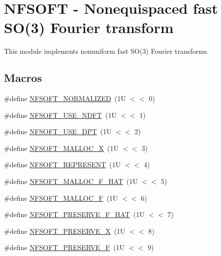 \hypertarget{group__nfsoft}{\section{N\-F\-S\-O\-F\-T -\/ Nonequispaced fast S\-O(3) Fourier transform}
\label{group__nfsoft}
}


This module implements nonuniform fast S\-O(3) Fourier transforms.  


\subsection*{Macros}
\begin{DoxyCompactItemize}
\item 
\#define \hyperlink{group__nfsoft_ga8c53e32dd194bda4a828c15ad044d44a}{N\-F\-S\-O\-F\-T\-\_\-\-N\-O\-R\-M\-A\-L\-I\-Z\-E\-D}~(1\-U $<$$<$ 0)
\item 
\#define \hyperlink{group__nfsoft_ga14cae92f8ee539b4a41aebdf913ef2c5}{N\-F\-S\-O\-F\-T\-\_\-\-U\-S\-E\-\_\-\-N\-D\-F\-T}~(1\-U $<$$<$ 1)
\item 
\#define \hyperlink{group__nfsoft_ga619b249b5d4b4675d2ce9a17d7817590}{N\-F\-S\-O\-F\-T\-\_\-\-U\-S\-E\-\_\-\-D\-P\-T}~(1\-U $<$$<$ 2)
\item 
\#define \hyperlink{group__nfsoft_gabe0d04599c1b06144e9a66fc2ac7b09d}{N\-F\-S\-O\-F\-T\-\_\-\-M\-A\-L\-L\-O\-C\-\_\-\-X}~(1\-U $<$$<$ 3)
\item 
\#define \hyperlink{group__nfsoft_ga379d5bf88e399cf492d86090ce47d47d}{N\-F\-S\-O\-F\-T\-\_\-\-R\-E\-P\-R\-E\-S\-E\-N\-T}~(1\-U $<$$<$ 4)
\item 
\#define \hyperlink{group__nfsoft_ga846e8298ed59219f7072230bd61c7a2a}{N\-F\-S\-O\-F\-T\-\_\-\-M\-A\-L\-L\-O\-C\-\_\-\-F\-\_\-\-H\-A\-T}~(1\-U $<$$<$ 5)
\item 
\#define \hyperlink{group__nfsoft_gac65bdc42b4c11296197dc991bbebbd12}{N\-F\-S\-O\-F\-T\-\_\-\-M\-A\-L\-L\-O\-C\-\_\-\-F}~(1\-U $<$$<$ 6)
\item 
\#define \hyperlink{group__nfsoft_ga83119b0d4e62f7cd83e0f74c5ef08dec}{N\-F\-S\-O\-F\-T\-\_\-\-P\-R\-E\-S\-E\-R\-V\-E\-\_\-\-F\-\_\-\-H\-A\-T}~(1\-U $<$$<$ 7)
\item 
\#define \hyperlink{group__nfsoft_ga2650cbfde4c8259e5059d6e9b91e0ec3}{N\-F\-S\-O\-F\-T\-\_\-\-P\-R\-E\-S\-E\-R\-V\-E\-\_\-\-X}~(1\-U $<$$<$ 8)
\item 
\#define \hyperlink{group__nfsoft_ga629a86dd29a3cf09872755cd82bf7062}{N\-F\-S\-O\-F\-T\-\_\-\-P\-R\-E\-S\-E\-R\-V\-E\-\_\-\-F}~(1\-U $<$$<$ 9)

\end{DoxyCompactItemize}

